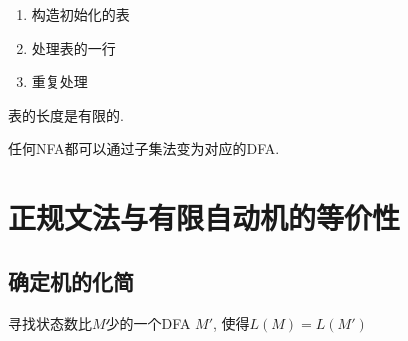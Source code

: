         \begin{enumerate}
            \item 构造初始化的表
            \item 处理表的一行
            \item 重复处理
        \end{enumerate}

        表的长度是有限的.

        任何NFA都可以通过子集法变为对应的DFA.

\section{正规文法与有限自动机的等价性}

    \subsection{确定机的化简}

        寻找状态数比$M$少的一个DFA $M'$, 使得$L(M)=L(M')$

\iffalse

    \section{词法分析器的自动生成}

\fi

